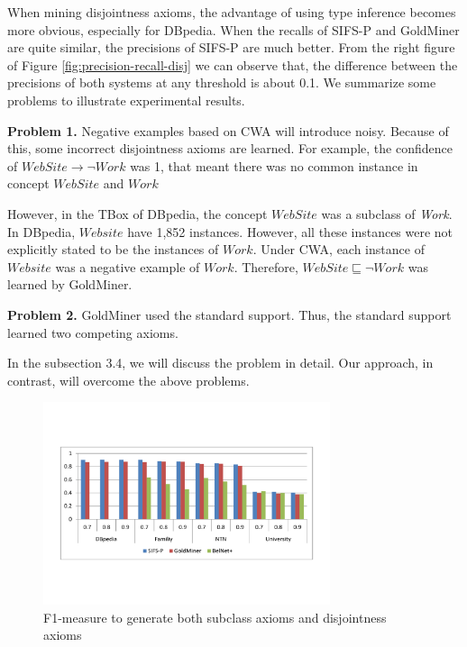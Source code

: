 When mining disjointness axioms, the advantage of using type inference becomes more obvious, especially for DBpedia. When the recalls of SIFS-P and GoldMiner are quite similar, the precisions of SIFS-P are much better. From the right figure of Figure \ref{fig:precision-recall-disj} we can observe that, the difference between the precisions of both systems at any threshold is about 0.1. We summarize some problems to illustrate experimental results.

\textbf{Problem 1.} Negative examples based on CWA will introduce noisy. Because of this, some incorrect disjointness axioms are learned. For example, the confidence of  $WebSite \rightarrow \neg Work$ was 1, that meant there was no common instance in concept $WebSite$ and $Work$

However, in the TBox of DBpedia, the concept $WebSite$ was a subclass of \emph{Work}. In DBpedia, ${Website}$ have 1,852 instances. However, all these instances were not explicitly stated to be the instances of $Work$. Under CWA, each instance of $Website$ was a negative example of $Work$. Therefore, $WebSite \sqsubseteq \neg Work$ was learned by GoldMiner.

\textbf{Problem 2.}  GoldMiner used the standard support. Thus, the standard support learned two competing axioms.

In the subsection 3.4, we will discuss the problem in detail. Our approach, in contrast, will overcome the above problems.
\begin{figure}
  \centering
  \includegraphics[width=0.75\textwidth]{figs/f1-both.pdf}
  \caption{F1-measure to generate both subclass axioms and disjointness axioms}\label{fig:f1-both}
\end{figure}


